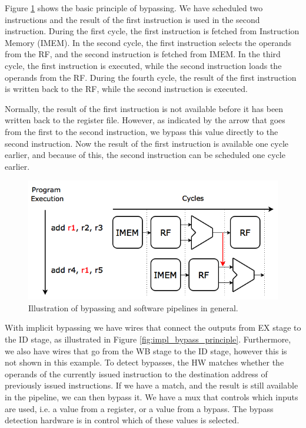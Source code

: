 Figure \ref{fig:bypass_principle} shows the basic principle of bypassing. We have scheduled two instructions and the result of the first instruction is used in the second instruction. During the first cycle, the first instruction is fetched from Instruction Memory (IMEM). In the second cycle, the first instruction selects the operands from the RF, and the second instruction is fetched from IMEM. In the third cycle, the first instruction is executed, while the second instruction loads the operands from the RF. During the fourth cycle, the result of the first instruction is written back to the RF, while the second instruction is executed.

Normally, the result of the first instruction is not available before it has been written back to the register file. However, as indicated by the arrow that goes from the first to the second instruction, we bypass this value directly to the second instruction. Now the result of the first instruction is available one cycle earlier, and because of this, the second instruction can be scheduled one cycle earlier.

\begin{figure}[H]
\centering
\includegraphics[width=.6\textwidth]{figures/bypassing_principle/05_bypassing_principle}
\caption{Illustration of bypassing and software pipelines in general.}
\label{fig:bypass_principle}
\end{figure}

With implicit bypassing we have wires that connect the outputs from EX stage to the ID stage, as illustrated in Figure \ref{fig:impl_bypass_principle}. Furthermore, we also have wires that go from the WB stage to the ID stage, however this is not shown in this example. To detect bypasses, the HW matches whether the operands of the currently issued instruction to the destination address of previously issued instructions. If we have a match, and the result is still available in the pipeline, we can then bypass it. We have a mux that controls which inputs are used, i.e. a value from a register, or a value from a bypass. The bypass detection hardware is in control which of these values is selected.

